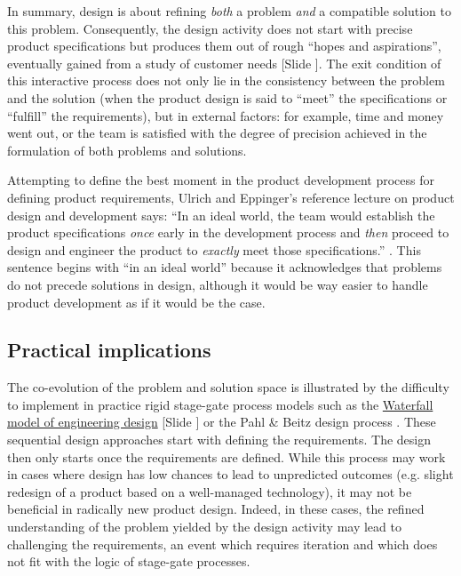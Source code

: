 \documentclass{article}
\newcounter{slide}
\begin{document}
In summary, design is about refining \emph{both} a problem \emph{and} a compatible solution to this problem. Consequently, the design activity does not start with precise product specifications but produces them out of rough ``hopes and aspirations'', eventually gained from a study of customer needs \cite[p. 73]{ulrichProductDesignDevelopment2011} {\color{blue}[Slide ]}. The exit condition of this interactive process does not only lie in the consistency between the problem and the solution (when the product design is said to ``meet'' the specifications or ``fulfill'' the requirements), but in external factors: for example, time and money went out, or the team is satisfied with the degree of precision achieved in the formulation of both problems and solutions. 

Attempting to define the best moment in the product development process for defining product requirements, Ulrich and Eppinger's reference lecture on product design and development says: ``In an ideal world, the team would establish the product specifications \emph{once} early in the development process and \emph{then} proceed to design and engineer the product to \emph{exactly} meet those specifications.'' \cite[p. 73, emphases are not in the original text]{ulrichProductDesignDevelopment2011}. This sentence begins with ``in an ideal world'' because it acknowledges that problems do not precede solutions in design, although it would be way easier to handle product development as if it would be the case. 


\subsection{Practical implications}
\label{sec:practicalimplicationstwo}

The co-evolution of the problem and solution space is illustrated by the difficulty to implement in practice rigid stage-gate process models such as the \href{https://en.wikipedia.org/wiki/Waterfall\_model}{Waterfall model of engineering design} {\color{blue}[Slide ]} or the Pahl \& Beitz design process \cite{pahlEngineeringDesignSystematic2007}. These sequential design approaches start with defining the requirements. The design then only starts once the requirements are defined. While this process may work in cases where design has low chances to lead to unpredicted outcomes (e.g. slight redesign of a product based on a well-managed technology), it may not be beneficial in radically new product design. Indeed, in these cases, the refined understanding of the problem yielded by the design activity may lead to challenging the requirements, an event which requires iteration and which does not fit with the logic of stage-gate processes.
\end{document}

